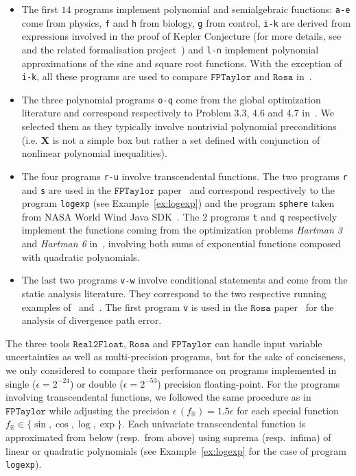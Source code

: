 \documentclass[preprint,fleqn,nocopyrightspace]{sigplanconf}
\newcommand{\code}[1]{\lstinline{#1}}
\newcommand{\R}{\mathbb{R}}
\def\X{\mathbf{X}}
\newcommand{\realtofloat}{\mathtt{Real2Float}}
\newcommand{\rosa}{\mathtt{Rosa}}
\newcommand{\fptaylor}{\mathtt{FPTaylor}}
\theoremstyle{plain}
\begin{document}
\begin{itemize}[noitemsep,nolistsep]
\item The first $14$ programs implement polynomial and semialgebraic functions: \code{a-e} come from physics, \code{f} and \code{h} from biology, \code{g} from control, \code{i-k} are derived from expressions involved in the proof of Kepler Conjecture (for more details, see~\cite{halesalgo} and the related formalisation project~\cite{Flyspeck06}) and \code{l-n} implement polynomial approximations of the sine and square root functions. With the exception of \code{i-k}, all these programs are used to compare $\fptaylor$ and $\rosa$ in~\cite{fptaylor15}. 
\item The three polynomial programs \code{o-q} come from the global optimization literature and correspond respectively to Problem 3.3, 4.6 and 4.7 in~\cite{Floudas90}. We selected them as they typically involve nontrivial polynomial preconditions (i.e. $\X$ is not a simple box but rather a set defined with conjunction of nonlinear polynomial inequalities).
\item The four programs \code{r-u} involve transcendental functions. The two programs \code{r} and \code{s} are used in the $\fptaylor$ paper~\cite{fptaylor15} and correspond respectively to the program \code{logexp} (see Example~\ref{ex:logexp}) and the program \code{sphere} taken from NASA World Wind Java SDK~\cite{NASA}. The $2$ programs \code{t} and \code{q} respectively implement the functions coming from the optimization problems \textit{Hartman 3} and \textit{Hartman 6} in~\cite{Ali05}, involving both sums of exponential functions composed with quadratic polynomials.
\item The last two programs \code{v-w} involve conditional statements and come from the static analysis literature. They correspond to the two respective running examples of~\cite{Zonotope10} and~\cite{Marechal14}. The first program \code{v} is used in the $\rosa$ paper~\cite{Darulova14Popl} for the analysis of divergence path error.
\end{itemize}
%
The three tools $\realtofloat$, $\rosa$ and $\fptaylor$ can handle input variable uncertainties as well as multi-precision programs, but for the sake of conciseness, we only considered to compare their performance on programs implemented in single ($\epsilon = 2^{-24}$) or double ($\epsilon = 2^{-53}$) precision floating-point.
For the programs involving transcendental functions, we followed the same procedure as in $\fptaylor$ while adjusting the precision $\epsilon \,  (f_{\R}) = 1.5 \epsilon$ for each special function $f_{\R} \in \{\sin, \cos, \log, \exp \}$. Each univariate transcendental function is approximated from below (resp.~from above) using suprema (resp.~infima) of linear or quadratic polynomials (see Example~\ref{ex:logexp} for the case of program \code{logexp}). 
%
\vspace*{-0.2cm}
\end{document}
